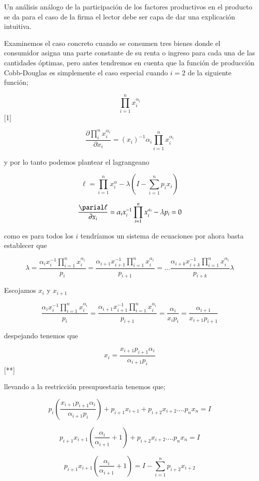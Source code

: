 \documentclass[12pt]{article}
\begin{document}
Un análisis análogo de la participación de los factores productivos en el producto  se da para el caso de la firma el lector debe ser capa de dar una explicación intuitiva.

Examinemos el caso concreto cuando se consumen tres bienes donde el consumidor asigna una parte constante de su renta o ingreso para cada una de las cantidades óptimas, pero antes tendremos en cuenta que la función de producción Cobb-Douglas es simplemente el caso especial cuando $i=2$ de la siguiente función;

$$\prod_{i=1}^n x_i^{\alpha_i}  $$ [1]


$$ \dfrac {\partial \prod_{i}^{n} x_{i}^{\alpha_{i}}}{\partial x_{i}}= (x_i)^{-1}\alpha_i\prod_{i=1}^{n}x_{i}^{\alpha_i}$$

y por lo tanto podemos plantear el lagrangeano


$$\ell = \prod_{i=1}^{n} x_{i}^{\alpha} - \lambda (I- \sum_{i=1}^{n}p_{i}x_{i} )$$

$$\dfrac{\parial \ell}{\partial x_{i}} = \alpha_{i}x_{i}^{-1} \prod_{i=1}^{n} x_{i}^{\alpha_{i}} - \lambda p_{i}= 0$$

como es para todos los $i$ tendríamos un sistema de ecuaciones por ahora basta establecer que 

$$\lambda=   \dfrac{\alpha_{i} x_{i}^{-1} \prod_{i=1}^{n} x_{i} ^{\alpha_{i}}}{p_{i}} = \dfrac{\alpha_{i+1} x_{i+1}^{-1} \prod_{i=1}^{n} x_{i} ^{\alpha_{i}}}{p_{i+1}}  =   ... \dfrac{\alpha_{i+k} x_{i+k}^{-1} \prod_{i=1}^{n} x_{i} ^{\alpha_{i}}}{p_{i+k}}  \lambda  $$


Escojamos $x_{i}$ y $x_{i+1}$

$$\dfrac{\alpha_{i} x_{i}^{-1} \prod_{i=1}^{n} x_{i} ^{\alpha_{i}}}{p_{i}} = \dfrac{\alpha_{i+1} x_{i+1}^{-1} \prod_{i=1}^{n} x_{i} ^{\alpha_{i}}}{p_{i+1}} = \dfrac{\alpha_{i}}{x_{i}p_{i}} = \dfrac{\alpha_{i+1}}{x_{i+1}p_{i+1}}$$ 


despejando tenemos que 

$$x_{i}=\dfrac{x_{i+1} p_{i+1} \alpha_{i}}{\alpha_{i+1} p_{i} }$$ [**]

llevando a la restricción presupuestaria tenemos que; 

$$p_{i} \left(\dfrac{x_{i+1} p_{i+1} \alpha_{i}}{\alpha_{i+1} p_{i} } \right)+ p_{i+1} x_{i+1}+ p_{i+2}x_{i+2} .... p_{n}x_{n} = I$$


$$p_{i+1} x_{i+1} \left( \dfrac{\alpha_{i}}{\alpha_{i+1}} +1 \right) + p_{i+2}x_{i+2} .... p_{n}x_{n} = I$$

$$ p_{i+1} x_{i+1} \left( \dfrac{\alpha_{i}}{\alpha_{i+1}} +1 \right) = I - \sum_{i=1}^{n}p_{i+2}x_{i+2}$$
\end{document}
